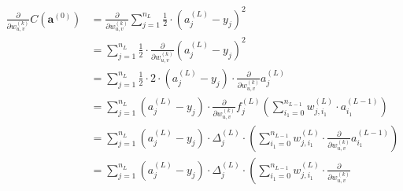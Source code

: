\documentclass[titlepage]{article}
\begin{document}
          \begin{equation}\label{eqkthpartder0}
            \begin{split}
              \frac{\partial}{\partial w_{u,v}^{(k)}}
                C \left( \mathbf{a}^{(0)} \right)
                  & = \frac{\partial}{\partial w_{u,v}^{(k)}}
                        \sum_{j=1}^{n_L}
                          \frac{1}{2}
                          \cdot
                          \left( a_j^{(L)} - y_j \right)^2 \\
                  & = \sum_{j=1}^{n_L}
                        \frac{1}{2}
                        \cdot
                        \frac{\partial}{\partial w_{u,v}^{(k)}}
                          \left( a_j^{(L)} - y_j \right)^2 \\
                  & = \sum_{j=1}^{n_L}
                        \frac{1}{2}
                        \cdot
                        2
                        \cdot
                        \left( a_j^{(L)} - y_j \right)
                        \cdot
                        \frac{\partial}{\partial w_{u,v}^{(k)}} a_j^{(L)} \\
                  & = \sum_{j=1}^{n_L}
                        \left( a_j^{(L)} - y_j \right)
                        \cdot
                        \frac{\partial}{\partial w_{u,v}^{(k)}}
                          f_j^{(L)} \left(
                            \sum_{i_1=0}^{n_{L-1}}
                              w_{j,i_1}^{(L)}
                              \cdot
                              a_{i_1}^{(L-1)}
                          \right) \\
                  & = \sum_{j=1}^{n_L}
                        \left( a_j^{(L)} - y_j \right)
                        \cdot
                        \Delta_j^{(L)}
                        \cdot
                        \left(
                          \sum_{i_1=0}^{n_{L-1}}
                            w_{j,i_1}^{(L)}
                            \cdot
                            \frac{\partial}{\partial w_{u,v}^{(k)}}
                              a_{i_1}^{(L-1)}
                        \right) \\
                  & = \sum_{j=1}^{n_L}
                        \left( a_j^{(L)} - y_j \right)
                        \cdot
                        \Delta_j^{(L)}
                        \cdot
                        \left(
                          \sum_{i_1=0}^{n_{L-1}}
                            w_{j,i_1}^{(L)}
                            \cdot
                            \frac{\partial}{\partial w_{u,v}^{(k)}}

\end{split}
\end{equation}
\end{document}
